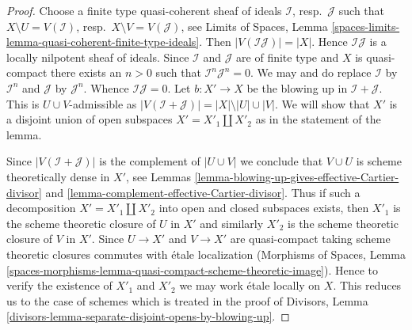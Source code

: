 \documentclass{stacks-project}
\theoremstyle{plain}
\theoremstyle{definition}
\theoremstyle{remark}
\numberwithin{equation}{subsection}
\begin{document}
\begin{proof}
Choose a finite type quasi-coherent sheaf of ideals $\mathcal{I}$,
resp.\ $\mathcal{J}$ such that $X \setminus U = V(\mathcal{I})$,
resp.\ $X \setminus V = V(\mathcal{J})$, see
Limits of Spaces, Lemma
\ref{spaces-limits-lemma-quasi-coherent-finite-type-ideals}.
Then $|V(\mathcal{I}\mathcal{J})| = |X|$. Hence
$\mathcal{I}\mathcal{J}$ is a locally nilpotent sheaf of ideals.
Since $\mathcal{I}$ and $\mathcal{J}$ are of finite type and $X$
is quasi-compact there exists an $n > 0$ such that
$\mathcal{I}^n \mathcal{J}^n = 0$. We may and do replace $\mathcal{I}$
by $\mathcal{I}^n$ and $\mathcal{J}$ by $\mathcal{J}^n$. Whence
$\mathcal{I} \mathcal{J} = 0$. Let $b : X' \to X$ be the blowing
up in $\mathcal{I} + \mathcal{J}$. This is $U \cup V$-admissible
as $|V(\mathcal{I} + \mathcal{J})| = |X| \setminus |U| \cup |V|$.
We will show that $X'$ is a disjoint union of open subspaces
$X' = X'_1 \amalg X'_2$ as in the statement of the lemma.

\medskip\noindent
Since $|V(\mathcal{I} + \mathcal{J})|$ is the complement of
$|U \cup V|$ we conclude that $V \cup U$ is scheme theoretically
dense in $X'$, see
Lemmas \ref{lemma-blowing-up-gives-effective-Cartier-divisor} and
\ref{lemma-complement-effective-Cartier-divisor}.
Thus if such a decomposition $X' = X'_1 \amalg X'_2$
into open and closed subspaces exists, then $X'_1$ is the
scheme theoretic closure of $U$ in $X'$ and similarly $X'_2$ is
the scheme theoretic closure of $V$ in $X'$. Since $U \to X'$
and $V \to X'$ are quasi-compact taking scheme theoretic
closures commutes with \'etale localization (Morphisms of Spaces,
Lemma \ref{spaces-morphisms-lemma-quasi-compact-scheme-theoretic-image}).
Hence to verify the existence of $X'_1$ and $X'_2$ we may work \'etale
locally on $X$. This reduces us to the case of schemes which is
treated in the proof of Divisors, Lemma
\ref{divisors-lemma-separate-disjoint-opens-by-blowing-up}.
\end{proof}
























\end{document}
